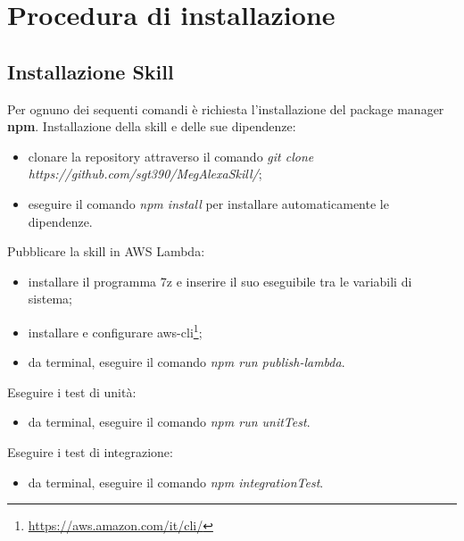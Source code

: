 \chapter{Procedura di installazione}

\section{Installazione Skill}
\label{installazioneSkill}
Per ognuno dei sequenti comandi è richiesta l'installazione del package manager \textbf{npm}.
Installazione della skill e delle sue dipendenze:
\begin{itemize}
    \item clonare la repository attraverso il comando \textit{git clone\\https://github.com/sgt390/MegAlexaSkill/};
    \item eseguire il comando \textit{npm install} per installare automaticamente le dipendenze.
\end{itemize}
Pubblicare la skill in AWS Lambda:
\begin{itemize}
    \item installare il programma 7z e inserire il suo eseguibile tra le variabili di sistema;
    \item installare e configurare aws-cli\footnote{\url{https://aws.amazon.com/it/cli/}};
    \item da terminal, eseguire il comando \textit{npm run publish-lambda}.
\end{itemize}
Eseguire i test di unità:
\begin{itemize}
    \item da terminal, eseguire il comando \textit{npm run unitTest}.
\end{itemize}
Eseguire i test di integrazione:
\begin{itemize}
    \item da terminal, eseguire il comando \textit{npm integrationTest}.
\end{itemize}